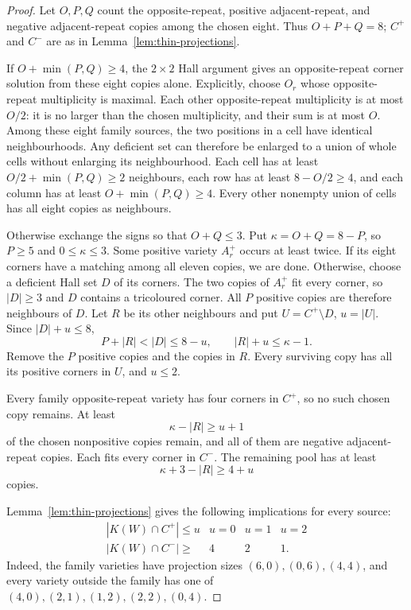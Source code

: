 \begin{proof}
Let $O,P,Q$ count the opposite-repeat, positive
adjacent-repeat, and negative adjacent-repeat copies among the chosen eight.
Thus $O+P+Q=8$; $C^+$ and $C^-$ are as in Lemma~\ref{lem:thin-projections}.

If $O+\min(P,Q)\ge4$, the $2\times2$ Hall argument gives an
opposite-repeat corner solution from these eight copies alone. Explicitly,
choose $O_r$ whose opposite-repeat multiplicity is maximal. Each other
opposite-repeat multiplicity is at most $O/2$: it is no larger than the
chosen multiplicity, and their sum is at most $O$. Among these eight family
sources, the two positions in a cell have identical neighbourhoods. Any
deficient set can therefore be enlarged to a union of whole cells without
enlarging its neighbourhood. Each cell has
at least $O/2+\min(P,Q)\ge2$ neighbours, each row has at least
$8-O/2\ge4$, and each column has at least $O+\min(P,Q)\ge4$.
Every other nonempty union of cells has all eight copies as neighbours.

Otherwise exchange the signs so that $O+Q\le3$. Put
$\kappa=O+Q=8-P$, so $P\ge5$ and $0\le \kappa\le3$.
Some positive variety $A_r^+$ occurs at least twice. If its eight
corners have a matching among all eleven copies, we are done. Otherwise,
choose a deficient Hall set $D$ of its corners. The two copies of
$A_r^+$ fit every corner, so $|D|\ge3$ and $D$ contains a tricoloured
corner. All $P$ positive copies are therefore neighbours of $D$.
Let $R$ be its other neighbours and put $U=C^+\setminus D$, $u=|U|$.
Since $|D|+u\le8$,
\[
 P+|R|<|D|\le8-u,\qquad |R|+u\le \kappa-1.
\]
Remove the $P$ positive copies and the copies in $R$. Every surviving
copy has all its positive corners in $U$, and $u\le2$.

Every family opposite-repeat variety has four corners in $C^+$, so no
such chosen copy remains. At least
\[
 \kappa-|R|\ge u+1
\]
of the chosen nonpositive copies remain, and all of them are negative
adjacent-repeat copies. Each fits every corner in $C^-$. The remaining
pool has at least
\[
 \kappa+3-|R|\ge4+u
\]
copies.

Lemma~\ref{lem:thin-projections} gives the following implications for every source:
\[
\begin{array}{c|ccc}
 |K(W)\cap C^+|\le u &u=0&u=1&u=2\\\hline
 |K(W)\cap C^-|\ge&4&2&1.
\end{array}
\]
Indeed, the family varieties have projection sizes $(6,0),(0,6),(4,4)$,
and every variety outside the family has one of
$(4,0),(2,1),(1,2),(2,2),(0,4)$.


\end{proof}
